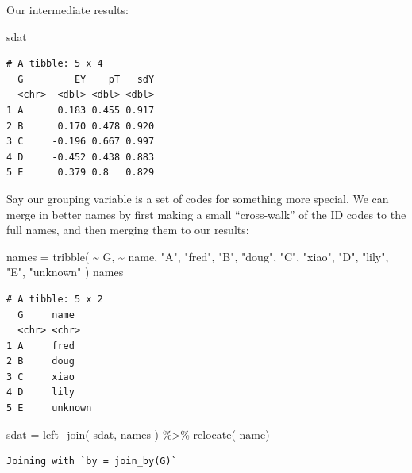 \documentclass[
  letterpaper,
  DIV=11,
  numbers=noendperiod]{scrreprt}
\newenvironment{Shaded}{\begin{snugshade}}{\end{snugshade}}
\newcommand{\FunctionTok}[1]{\textcolor[rgb]{0.02,0.16,0.49}{#1}}
\newcommand{\NormalTok}[1]{\textcolor[rgb]{0.00,0.44,0.13}{#1}}
\newcommand{\OtherTok}[1]{\textcolor[rgb]{0.00,0.44,0.13}{#1}}
\newcommand{\SpecialCharTok}[1]{\textcolor[rgb]{0.25,0.44,0.63}{#1}}
\newcommand{\StringTok}[1]{\textcolor[rgb]{0.25,0.44,0.63}{#1}}
\begin{document}
Our intermediate results:

\begin{Shaded}
\begin{Highlighting}[]
\NormalTok{sdat}
\end{Highlighting}
\end{Shaded}

\begin{verbatim}
# A tibble: 5 x 4
  G         EY    pT   sdY
  <chr>  <dbl> <dbl> <dbl>
1 A      0.183 0.455 0.917
2 B      0.170 0.478 0.920
3 C     -0.196 0.667 0.997
4 D     -0.452 0.438 0.883
5 E      0.379 0.8   0.829
\end{verbatim}

Say our grouping variable is a set of codes for something more special.
We can merge in better names by first making a small ``cross-walk'' of
the ID codes to the full names, and then merging them to our results:

\begin{Shaded}
\begin{Highlighting}[]
\NormalTok{names }\OtherTok{=} \FunctionTok{tribble}\NormalTok{( }\SpecialCharTok{\textasciitilde{}}\NormalTok{ G, }\SpecialCharTok{\textasciitilde{}}\NormalTok{ name,}
                 \StringTok{"A"}\NormalTok{, }\StringTok{"fred"}\NormalTok{,}
                 \StringTok{"B"}\NormalTok{, }\StringTok{"doug"}\NormalTok{,}
                 \StringTok{"C"}\NormalTok{, }\StringTok{"xiao"}\NormalTok{,}
                 \StringTok{"D"}\NormalTok{, }\StringTok{"lily"}\NormalTok{,}
                 \StringTok{"E"}\NormalTok{, }\StringTok{"unknown"}\NormalTok{ )}
\NormalTok{names}
\end{Highlighting}
\end{Shaded}

\begin{verbatim}
# A tibble: 5 x 2
  G     name   
  <chr> <chr>  
1 A     fred   
2 B     doug   
3 C     xiao   
4 D     lily   
5 E     unknown
\end{verbatim}

\begin{Shaded}
\begin{Highlighting}[]
\NormalTok{sdat }\OtherTok{=} \FunctionTok{left\_join}\NormalTok{( sdat, names ) }\SpecialCharTok{\%\textgreater{}\%}
    \FunctionTok{relocate}\NormalTok{( name)}
\end{Highlighting}
\end{Shaded}

\begin{verbatim}
Joining with `by = join_by(G)`
\end{verbatim}
\end{document}

